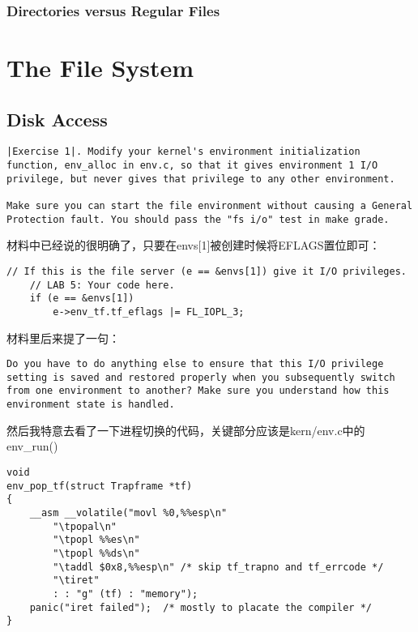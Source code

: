 \documentclass{article}
\newcommand{\funcname}[1]{{\ttfamily \small #1}}
\begin{document}
\begin{CJK*}{UTF8}{gkai}
\subsubsection{Directories versus Regular Files}

\section{The File System}

\subsection{Disk Access}

\begin{lstlisting}[style=exercise]
|Exercise 1|. Modify your kernel's environment initialization function, env_alloc in env.c, so that it gives environment 1 I/O privilege, but never gives that privilege to any other environment.

Make sure you can start the file environment without causing a General Protection fault. You should pass the "fs i/o" test in make grade.
\end{lstlisting}

材料中已经说的很明确了，只要在envs[1]被创建时候将EFLAGS置位即可：

\begin{lstlisting}[style=ccode, title={\scriptsize \ttfamily \bfseries kern/env.c: env\_alloc ()}]
	// If this is the file server (e == &envs[1]) give it I/O privileges.
	// LAB 5: Your code here.
	if (e == &envs[1])
		e->env_tf.tf_eflags |= FL_IOPL_3;
\end{lstlisting}


材料里后来提了一句：

\begin{lstlisting}[style=exercise]
Do you have to do anything else to ensure that this I/O privilege setting is saved and restored properly when you subsequently switch from one environment to another? Make sure you understand how this environment state is handled.
\end{lstlisting}

然后我特意去看了一下进程切换的代码，关键部分应该是kern/env.c中的 \funcname{ env\_run()}

\begin{lstlisting}[style=ccode, title={\scriptsize \ttfamily \bfseries kern/env.c}]
void
env_pop_tf(struct Trapframe *tf)
{
	__asm __volatile("movl %0,%%esp\n"
		"\tpopal\n"
		"\tpopl %%es\n"
		"\tpopl %%ds\n"
		"\taddl $0x8,%%esp\n" /* skip tf_trapno and tf_errcode */
		"\tiret"
		: : "g" (tf) : "memory");
	panic("iret failed");  /* mostly to placate the compiler */
}


\end{lstlisting}
\end{CJK*}
\end{document}
